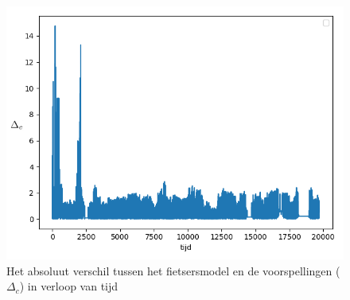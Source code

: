 \begin{figure}[hp]
	\includegraphics[width=\linewidth]{images/evaluatie/stochastic_diff_rf.png}
	\caption{Het absoluut verschil tussen het fietsersmodel en de voorspellingen ($\Delta_c$) in verloop van tijd}
	\label{fig:stochastic diff rf}
\end{figure}
\newpage
